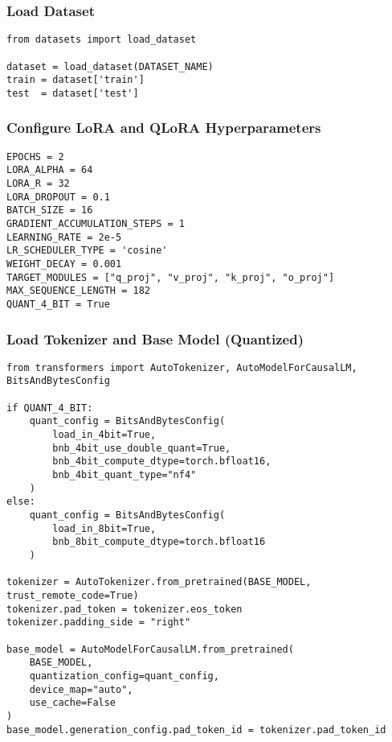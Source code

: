\subsubsection{Load Dataset}
\begin{tcolorbox}[colback=green!5!white, colframe=green!75!black, title=Load Dataset from Hub]
\begin{verbatim}
from datasets import load_dataset

dataset = load_dataset(DATASET_NAME)
train = dataset['train']
test  = dataset['test']
\end{verbatim}
\end{tcolorbox}

\subsubsection{Configure LoRA and QLoRA Hyperparameters}
\begin{tcolorbox}[colback=yellow!5!white, colframe=yellow!75!black, title=LoRA and Quantization Settings]
\begin{verbatim}
EPOCHS = 2
LORA_ALPHA = 64
LORA_R = 32
LORA_DROPOUT = 0.1
BATCH_SIZE = 16
GRADIENT_ACCUMULATION_STEPS = 1
LEARNING_RATE = 2e-5
LR_SCHEDULER_TYPE = 'cosine'
WEIGHT_DECAY = 0.001
TARGET_MODULES = ["q_proj", "v_proj", "k_proj", "o_proj"]
MAX_SEQUENCE_LENGTH = 182
QUANT_4_BIT = True
\end{verbatim}
\end{tcolorbox}

\subsubsection{Load Tokenizer and Base Model (Quantized)}
\begin{tcolorbox}[colback=blue!5!white, colframe=blue!75!black, title=Tokenizer \& Quantized Model]
\begin{verbatim}
from transformers import AutoTokenizer, AutoModelForCausalLM, BitsAndBytesConfig

if QUANT_4_BIT:
    quant_config = BitsAndBytesConfig(
        load_in_4bit=True,
        bnb_4bit_use_double_quant=True,
        bnb_4bit_compute_dtype=torch.bfloat16,
        bnb_4bit_quant_type="nf4"
    )
else:
    quant_config = BitsAndBytesConfig(
        load_in_8bit=True,
        bnb_8bit_compute_dtype=torch.bfloat16
    )

tokenizer = AutoTokenizer.from_pretrained(BASE_MODEL, trust_remote_code=True)
tokenizer.pad_token = tokenizer.eos_token
tokenizer.padding_side = "right"

base_model = AutoModelForCausalLM.from_pretrained(
    BASE_MODEL,
    quantization_config=quant_config,
    device_map="auto",
    use_cache=False
)
base_model.generation_config.pad_token_id = tokenizer.pad_token_id
\end{verbatim}
\end{tcolorbox}


